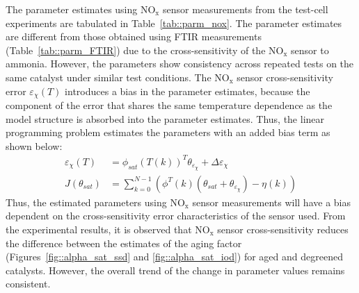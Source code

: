 \documentclass[subscriptcorrection,upint,varvw,barcolor=Goldenrod3,mathalfa=cal=euler,balance,hyphenate,french,pdf-a]{asmejour}
\newcommand{\lr}[1]{\left( #1 \right)}
\newcommand{\nox}{\text{NO}_{\text{x}}}
\begin{document}
\par The parameter estimates using $\nox$ sensor measurements from the test-cell experiments are tabulated in
Table~\ref{tab::parm_nox}. The parameter estimates are different from those obtained using FTIR measurements
(Table~\ref{tab::parm_FTIR}) due to the cross-sensitivity of the $\nox$ sensor to ammonia. However, the parameters show
consistency across repeated tests on the same catalyst under similar test conditions. The $\nox$ sensor
cross-sensitivity error $\varepsilon_{\chi}(T)$ introduces a bias in the parameter estimates, because the component of
the error that shares the same temperature dependence as the model structure is absorbed into the parameter estimates.
Thus, the linear programming problem estimates the parameters with an added bias term as shown below:
\begin{align}
        \varepsilon_{\chi}(T) & = \phi_{sat}(T(k))^T \theta_{\varepsilon_{\chi}} + \Delta\varepsilon_{\chi}                    \\
        J(\theta_{sat})
                              & = \sum_{k=0}^{N-1} \lr{ \phi^T(k) \lr{\theta_{sat} + \theta_{\varepsilon_{\chi}}} - \eta (k) }
        \label{eqn::nox_cost}
\end{align}
Thus, the estimated parameters using $\nox$ sensor measurements will have a bias dependent on the cross-sensitivity
error characteristics of the sensor used. From the experimental results, it is observed that $\nox$ sensor
cross-sensitivity reduces the difference between the estimates of the aging factor
(Figures~\ref{fig::alpha_sat_ssd} and \ref{fig::alpha_sat_iod}) for aged and degreened catalysts. However, the overall trend
of the change in parameter values remains consistent.
\end{document}
